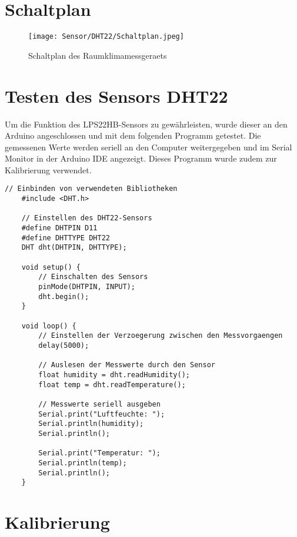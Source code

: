 \section{Schaltplan}

\begin{figure}[H]
    \begin{flushleft} 
        \centering
        \texttt{[image: Sensor/DHT22/Schaltplan.jpeg]}
        \caption{Schaltplan des Raumklimamessgeraets}
        \label{fig:SP}
    \end{flushleft}
\end{figure}


\section{Testen des Sensors  DHT22}

Um die Funktion des LPS22HB-Sensors zu gewährleisten, wurde dieser an den Arduino angeschlossen und mit dem folgenden Programm getestet. Die gemessenen Werte werden seriell an den Computer weitergegeben und im Serial Monitor in der Arduino IDE angezeigt. Dieses Programm wurde zudem zur Kalibrierung verwendet.

\begin{lstlisting}[language=Arduino]
    // Einbinden von verwendeten Bibliotheken
    #include <DHT.h>
    
    // Einstellen des DHT22-Sensors
    #define DHTPIN D11   
    #define DHTTYPE DHT22    
    DHT dht(DHTPIN, DHTTYPE);
    
    void setup() {
        // Einschalten des Sensors
        pinMode(DHTPIN, INPUT);
        dht.begin();
    }
    
    void loop() {
        // Einstellen der Verzoegerung zwischen den Messvorgaengen
        delay(5000);
        
        // Auslesen der Messwerte durch den Sensor
        float humidity = dht.readHumidity(); 
        float temp = dht.readTemperature(); 
        
        // Messwerte seriell ausgeben
        Serial.print("Luftfeuchte: ");
        Serial.println(humidity);
        Serial.println();
        
        Serial.print("Temperatur: ");
        Serial.println(temp);
        Serial.println();
    }
\end{lstlisting}





\section{Kalibrierung}

